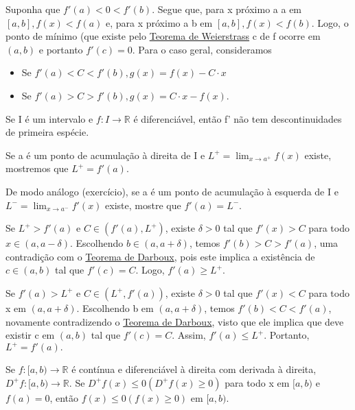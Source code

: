 \documentclass[analysis_notes.tex]{subfiles}
\begin{document}
\begin{proof*}
	Suponha que \(f'(a) < 0 < f'(b)\). Segue que, para x próximo a a em \([a, b], f(x) < f(a)\)
	e, para x próximo a b em \([a, b], f(x) < f(b).\) Logo, o ponto de mínimo (que existe pelo
	\hyperlink{weierstrass}{Teorema de Weierstrass} c de f ocorre em \((a, b)\) e
	portanto \(f'(c) = 0.\) Para o caso geral, consideramos
	\begin{itemize}
		\item Se \(f'(a) < C < f'(b), g(x) = f(x) - C \cdot x\)
		\item Se \(f'(a) > C > f'(b), g(x) = C \cdot x - f(x).\)
	\end{itemize}
\end{proof*}
\begin{theorem*}
	Se I é um intervalo e \(f:I\rightarrow \mathbb{R}\) é diferenciável, então
	f' não tem descontinuidades de primeira espécie.
\end{theorem*}
\begin{proof*}
	Se a é um ponto de acumula\c cão à direita de I e \(L^{+}=\lim_{x\to a^{+}}f(x)\)
	existe, mostremos que \(L^{+} = f'(a).\)

	De modo análogo (exercício), se a é um ponto de acumula\c cão à esquerda de I
	e \(L^{-}=\lim_{x\to a^{-}}f'(x)\) existe, mostre que \(f'(a) = L^{-}.\)

	Se \(L^{+} > f'(a)\) e \(C\in(f'(a), L^{+})\), existe \(\delta >0\) tal que
	\(f'(x) > C\) para todo \(x\in(a, a-\delta ).\) Escolhendo \(b\in(a, a+\delta )\),
	temos \(f'(b) > C > f'(a)\), uma contradi\c cão com o \hyperlink{darboux}{Teorema de Darboux},
	pois este implica a existência de \(c\in(a, b)\) tal que \(f'(c) = C.\) Logo,
	\(f'(a)\geq L^{+}.\)

	Se \(f'(a) > L^{+}\) e \(C\in(L^{+}, f'(a))\), existe \(\delta >0\) tal que
	\(f'(x) < C\) para todo x em \((a, a+\delta )\). Escolhendo b em \((a, a+\delta )\),
	temos \(f'(b) < C < f'(a)\), novamente contradizendo o \hyperlink{darboux}{Teorema de Darboux},
	visto que ele implica que deve existir c em \((a, b)\) tal que \(f'(c) = C.\) Assim,
	\(f'(a)\leq L^{+}.\) Portanto, \(L^{+} = f'(a).\) \qedsymbol
\end{proof*}
\begin{theorem*}
	Se \(f:[a, b)\rightarrow \mathbb{R}\) é contínua e diferenciável à direita com
	derivada à direita, \(D^{+}f:[a, b)\rightarrow \mathbb{R}.\) Se \(D^{+}f(x)\leq 0 (D^{+}f(x)\geq 0)\)
	para todo x em \([a, b)\) e \(f(a) = 0\), então \(f(x)\leq 0 (f(x)\geq 0)\) em \([a, b).\)
\end{theorem*}
\end{document}
